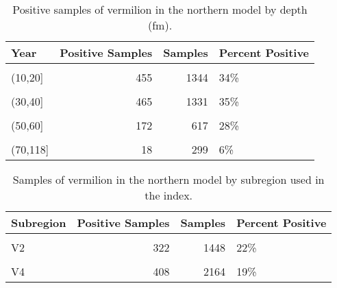 \documentclass[
]{article}
\begin{document}
\begin{table}

\caption{\label{tab:tab-depth-debwv}Positive samples of vermilion in the northern model by depth (fm).}
\centering
\begin{tabular}[t]{lrrl}
\toprule
Year & Positive Samples & Samples & Percent Positive\\
\midrule
\cellcolor{gray!6}{(0,10]} & \cellcolor{gray!6}{113} & \cellcolor{gray!6}{478} & \cellcolor{gray!6}{24\%}\\
(10,20] & 455 & 1344 & 34\%\\
\cellcolor{gray!6}{(20,30]} & \cellcolor{gray!6}{410} & \cellcolor{gray!6}{1198} & \cellcolor{gray!6}{34\%}\\
(30,40] & 465 & 1331 & 35\%\\
\cellcolor{gray!6}{(40,50]} & \cellcolor{gray!6}{347} & \cellcolor{gray!6}{1067} & \cellcolor{gray!6}{33\%}\\
\addlinespace
(50,60] & 172 & 617 & 28\%\\
\cellcolor{gray!6}{(60,70]} & \cellcolor{gray!6}{36} & \cellcolor{gray!6}{263} & \cellcolor{gray!6}{14\%}\\
(70,118] & 18 & 299 & 6\%\\
\bottomrule
\end{tabular}
\end{table}

\FloatBarrier

\begin{table}

\caption{\label{tab:tab-region-debwv}Samples of vermilion in the northern model by subregion used in the index.}
\centering
\begin{tabular}[t]{lrrl}
\toprule
Subregion & Positive Samples & Samples & Percent Positive\\
\midrule
\cellcolor{gray!6}{V1} & \cellcolor{gray!6}{362} & \cellcolor{gray!6}{1317} & \cellcolor{gray!6}{27\%}\\
V2 & 322 & 1448 & 22\%\\
\cellcolor{gray!6}{V3} & \cellcolor{gray!6}{924} & \cellcolor{gray!6}{1668} & \cellcolor{gray!6}{55\%}\\
V4 & 408 & 2164 & 19\%\\
\bottomrule
\end{tabular}
\end{table}
\end{document}
